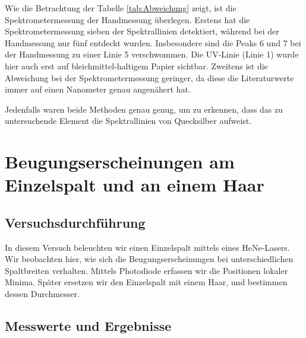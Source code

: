 \documentclass{scrartcl}
\begin{document}
Wie die Betrachtung der Tabelle \ref{tab:Abweichung} zeigt, ist die Spektrometermessung der Handmessung überlegen. Erstens hat die Spektrometermessung sieben der Spektrallinien detektiert, während bei der Handmessung nur fünf entdeckt wurden. Insbesondere sind die Peaks 6 und 7 bei der Handmessung zu einer Linie 5 verschwommen. Die UV-Linie (Linie 1) wurde hier auch erst auf bleichmittel-haltigem Papier sichtbar. Zweitens ist die Abweichung bei der Spektrometermessung geringer, da diese die Literaturwerte immer auf einen Nanometer genau angenähert hat.

Jedenfalls waren beide Methoden genau genug, um zu erkennen, dass das zu untersuchende Element die Spektrallinien von Quecksilber aufweist.

\section{Beugungserscheinungen am Einzelspalt und an einem Haar}
\subsection{Versuchsdurchführung}
In diesem Versuch beleuchten wir einen Einzelspalt mittels eines HeNe-Lasers. Wir beobachten hier, wie sich die Beugungserscheinungen bei unterschiedlichen Spaltbreiten verhalten. Mittels Photodiode erfassen wir die Positionen lokaler Minima. Später ersetzen wir den Einzelspalt mit einem Haar, und bestimmen dessen Durchmesser.
\subsection{Messwerte und Ergebnisse}
\end{document}
